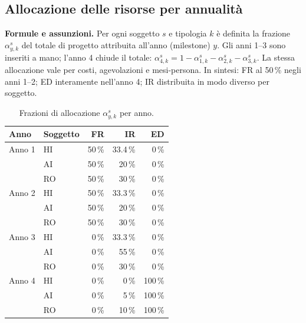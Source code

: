 \documentclass{plan4ari_report}
\begin{document}
\subsection{Allocazione delle risorse per annualit\`a}
\textbf{Formule e assunzioni.} Per ogni soggetto $s$ e tipologia $k$ \`e definita la frazione $\alpha^{s}_{y,k}$ del totale di progetto attribuita all'anno (milestone) $y$. Gli anni 1--3 sono inseriti a mano; l'anno 4 chiude il totale: $\alpha^{s}_{4,k} = 1 - \alpha^{s}_{1,k} - \alpha^{s}_{2,k} - \alpha^{s}_{3,k}$. La stessa allocazione vale per costi, agevolazioni e mesi-persona. In sintesi: FR al 50\,\% negli anni 1--2; ED interamente nell'anno 4; IR distribuita in modo diverso per soggetto.

\begin{table}[H]\centering\small\caption{Frazioni di allocazione $\alpha^{s}_{y,k}$ per anno.}\label{tab:alloc}
\begin{tabular}{llrrr}\toprule\textbf{Anno} & \textbf{Soggetto} & \textbf{FR} & \textbf{IR} & \textbf{ED} \\\midrule
Anno 1 & HI & 50\,\% & 33.4\,\% & 0\,\% \\
 & AI & 50\,\% & 20\,\% & 0\,\% \\
 & RO & 50\,\% & 30\,\% & 0\,\% \\
\midrule
Anno 2 & HI & 50\,\% & 33.3\,\% & 0\,\% \\
 & AI & 50\,\% & 20\,\% & 0\,\% \\
 & RO & 50\,\% & 30\,\% & 0\,\% \\
\midrule
Anno 3 & HI & 0\,\% & 33.3\,\% & 0\,\% \\
 & AI & 0\,\% & 55\,\% & 0\,\% \\
 & RO & 0\,\% & 30\,\% & 0\,\% \\
\midrule
Anno 4 & HI & 0\,\% & 0\,\% & 100\,\% \\
 & AI & 0\,\% & 5\,\% & 100\,\% \\
 & RO & 0\,\% & 10\,\% & 100\,\% \\
\bottomrule\end{tabular}\end{table}


\end{document}
